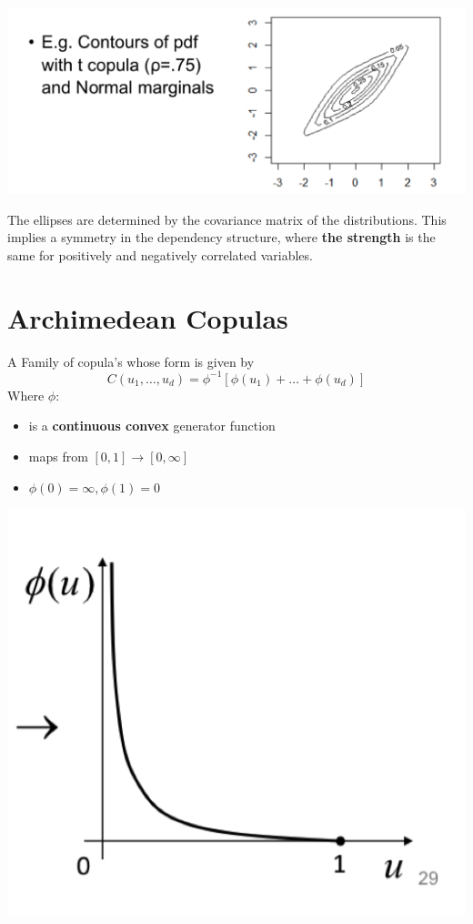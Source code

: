 \documentclass[
  oneside]{book}
\providecommand{\tightlist}{%
  \setlength{\itemsep}{0pt}\setlength{\parskip}{0pt}}
\begin{document}
\includegraphics{Notes/Obsidian-Attachments/4-Multivariate-Return-Modelling-9.png}

The ellipses are determined by the covariance matrix of the distributions. This implies a symmetry in the dependency structure, where \textbf{the strength} is the same for positively and negatively correlated variables.

\hypertarget{archimedean-copulas}{%
\section{Archimedean Copulas}\label{archimedean-copulas}}

A Family of copula's whose form is given by
\[
C(u_{1},\dots,u_{d}) = \phi ^{-1}[\phi(u_{1})+\dots+\phi(u_{d})]
\]
Where \(\phi\):

\begin{itemize}
\tightlist
\item
  is a \textbf{continuous convex} generator function
\item
  maps from \([0,1] \to [0,\infty]\)
\item
  \(\phi(0)=\infty, \phi(1)=0\)
\end{itemize}

\includegraphics{Notes/Obsidian-Attachments/4-Multivariate-Return-Modelling-10.png}
\end{document}
